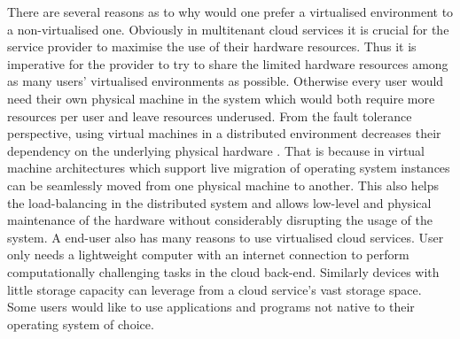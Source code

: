 There are several reasons as to why would one prefer a virtualised environment to a non-virtualised one. Obviously in multitenant cloud services it is crucial for the service provider to maximise the use of their hardware resources. Thus it is imperative for the provider to try to share the limited hardware resources among as many users' virtualised environments as possible. Otherwise every user would need their own physical machine in the system which would both require more resources per user and leave resources underused. From the fault tolerance perspective, using virtual machines in a distributed environment decreases their dependency on the underlying physical hardware \cite{Clark05livemigration}. That is because in virtual machine architectures which support live migration of operating system instances can be seamlessly moved from one physical machine to another. This also helps the load-balancing in the distributed system and allows low-level and physical maintenance of the hardware without considerably disrupting the usage of the system. A end-user also has many reasons to use virtualised cloud services. User only needs a lightweight computer with an internet connection to perform computationally challenging tasks in the cloud back-end. Similarly devices with little storage capacity can leverage from a cloud service's vast storage space. Some users would like to use applications and programs not native to their operating system of choice.
	
